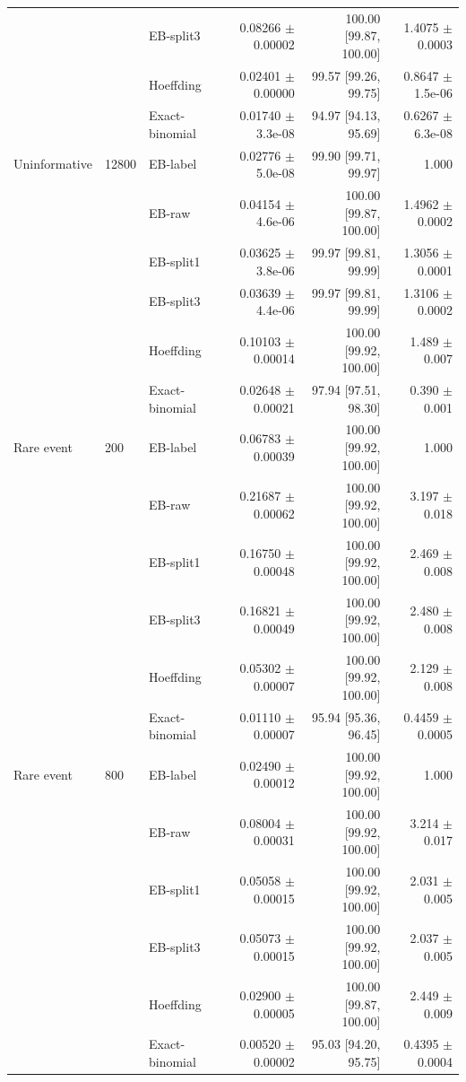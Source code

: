 \begin{longtable}{lllrrr}
 &  & EB-split3 & 0.08266 $\pm$ 0.00002 & 100.00 [99.87, 100.00] & 1.4075 $\pm$ 0.0003 \\
 &  & Hoeffding & 0.02401 $\pm$ 0.00000 & 99.57 [99.26, 99.75] & 0.8647 $\pm$ 1.5e-06 \\
 &  & Exact-binomial & 0.01740 $\pm$ 3.3e-08 & 94.97 [94.13, 95.69] & 0.6267 $\pm$ 6.3e-08 \\
Uninformative & 12800 & EB-label & 0.02776 $\pm$ 5.0e-08 & 99.90 [99.71, 99.97] & 1.000 \\
 &  & EB-raw & 0.04154 $\pm$ 4.6e-06 & 100.00 [99.87, 100.00] & 1.4962 $\pm$ 0.0002 \\
 &  & EB-split1 & 0.03625 $\pm$ 3.8e-06 & 99.97 [99.81, 99.99] & 1.3056 $\pm$ 0.0001 \\
 &  & EB-split3 & 0.03639 $\pm$ 4.4e-06 & 99.97 [99.81, 99.99] & 1.3106 $\pm$ 0.0002 \\
 &  & Hoeffding & 0.10103 $\pm$ 0.00014 & 100.00 [99.92, 100.00] & 1.489 $\pm$ 0.007 \\
 &  & Exact-binomial & 0.02648 $\pm$ 0.00021 & 97.94 [97.51, 98.30] & 0.390 $\pm$ 0.001 \\
Rare event & 200 & EB-label & 0.06783 $\pm$ 0.00039 & 100.00 [99.92, 100.00] & 1.000 \\
 &  & EB-raw & 0.21687 $\pm$ 0.00062 & 100.00 [99.92, 100.00] & 3.197 $\pm$ 0.018 \\
 &  & EB-split1 & 0.16750 $\pm$ 0.00048 & 100.00 [99.92, 100.00] & 2.469 $\pm$ 0.008 \\
 &  & EB-split3 & 0.16821 $\pm$ 0.00049 & 100.00 [99.92, 100.00] & 2.480 $\pm$ 0.008 \\
 &  & Hoeffding & 0.05302 $\pm$ 0.00007 & 100.00 [99.92, 100.00] & 2.129 $\pm$ 0.008 \\
 &  & Exact-binomial & 0.01110 $\pm$ 0.00007 & 95.94 [95.36, 96.45] & 0.4459 $\pm$ 0.0005 \\
Rare event & 800 & EB-label & 0.02490 $\pm$ 0.00012 & 100.00 [99.92, 100.00] & 1.000 \\
 &  & EB-raw & 0.08004 $\pm$ 0.00031 & 100.00 [99.92, 100.00] & 3.214 $\pm$ 0.017 \\
 &  & EB-split1 & 0.05058 $\pm$ 0.00015 & 100.00 [99.92, 100.00] & 2.031 $\pm$ 0.005 \\
 &  & EB-split3 & 0.05073 $\pm$ 0.00015 & 100.00 [99.92, 100.00] & 2.037 $\pm$ 0.005 \\
 &  & Hoeffding & 0.02900 $\pm$ 0.00005 & 100.00 [99.87, 100.00] & 2.449 $\pm$ 0.009 \\
 &  & Exact-binomial & 0.00520 $\pm$ 0.00002 & 95.03 [94.20, 95.75] & 0.4395 $\pm$ 0.0004 \\

\end{longtable}
